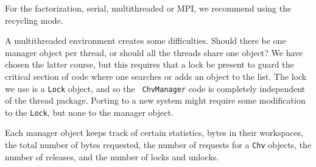 For the factorization, serial, multithreaded or MPI,
we recommend using the recycling mode.
\par
A multithreaded environment creates some difficulties.
Should there be one manager object per thread, or should all the
threads share one object?
We have chosen the latter course, but this requires that a lock be
present to guard the critical section of code where one searches or
adds an object to the list.
The lock we use is a {\tt Lock} object, and so the {\tt
ChvManager} code is completely independent of the thread package.
Porting to a new system might require some modification to
the {\tt Lock}, but none to the manager object.
\par
Each manager object keeps track of certain statistics,
bytes in their workspaces, the total number of bytes requested,
the number of requests for a {\tt Chv} objects, the number of
releases, and the number of locks and unlocks.

